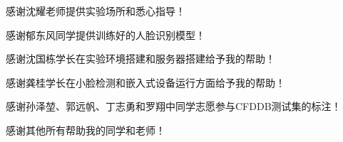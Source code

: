 \begin{thanks}

  感谢沈耀老师提供实验场所和悉心指导！

  感谢郁东风同学提供训练好的人脸识别模型！

  感谢沈国栋学长在实验环境搭建和服务器搭建给予我的帮助！
  
  感谢龚桂学长在小脸检测和嵌入式设备运行方面给予我的帮助！
  
  感谢孙泽堃、郭远帆、丁志勇和罗翔中同学志愿参与CFDDB测试集的标注！
  
  感谢其他所有帮助我的同学和老师！

\end{thanks}
